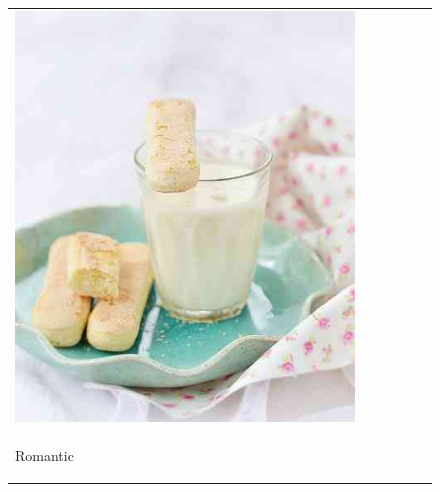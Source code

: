 \begin{figure}
\begin{tabular}{m{.01\linewidth} m{.16\linewidth} m{.16\linewidth} m{.16\linewidth} m{.16\linewidth} m{.16\linewidth}}
    \includegraphics[width=\linewidth]{../style/figures/flickr_on_flickr/pred_style_Pastel/4.jpg} \\
    \begin{turn}{90}{Romantic}\end{turn} &

\end{tabular}
\end{figure}
